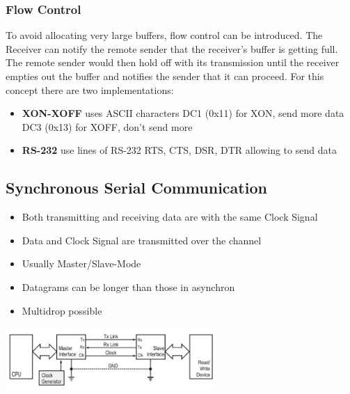 \subsubsection{Flow Control}
To avoid allocating very large buffers, flow control can be introduced.
The Receiver can notify the remote sender that the receiver's buffer is getting full.
The remote sender would then hold off with its transmission until the receiver empties out the buffer and notifies the sender that it can proceed.
For this concept there are two implementations:
\begin{itemize}
	\item \textbf{XON-XOFF} uses ASCII characters
	\subitem DC1 (0x11) for XON, send more data
	\subitem DC3 (0x13) for XOFF, don't send more
	\item \textbf{RS-232} use lines of RS-232
	\subitem RTS, CTS, DSR, DTR allowing to send data
\end{itemize}
\subsection{Synchronous Serial Communication }
\begin{minipage}{11cm}
	\begin{itemize}
		\item Both transmitting and receiving data are with the same Clock Signal
		\item Data and Clock Signal are transmitted over the channel
		\item Usually Master/Slave-Mode
		\item Datagrams can be longer than those in asynchron
		\item Multidrop possible
	\end{itemize}
\end{minipage}
\begin{minipage}{8cm}
	\includegraphics[width=8cm]{images/syn.png}
\end{minipage}
